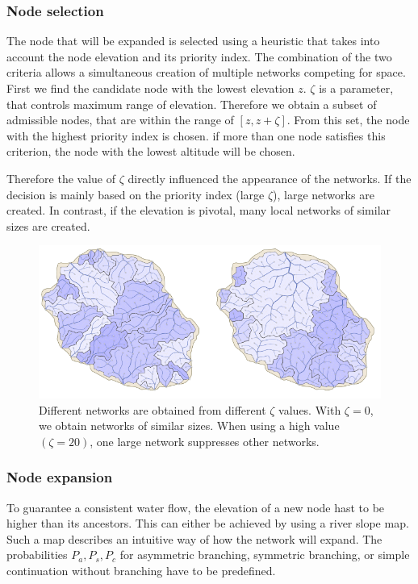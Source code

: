\subsubsection{Node selection}
The node that will be expanded is selected using a heuristic that takes into account the node elevation and its priority index. The combination of the two criteria allows a simultaneous creation of multiple networks competing for space. 
First we find the candidate node with the lowest elevation $z$. 
$\zeta $ is a parameter, that controls maximum range of elevation. Therefore we obtain a subset of admissible nodes, that are within the range of $[z, z + \zeta]$. From this set, the node with the highest priority index is chosen. if more than one node satisfies this criterion, the node with the lowest altitude will be chosen. 

Therefore the value of $\zeta$ directly influenced the appearance of the networks. If the decision is mainly based on the priority index (large $\zeta$), large networks are created. In contrast, if the elevation is pivotal, many local networks of similar sizes are created.

\begin{figure}[htb]
	\centering
	\includegraphics[width=\linewidth]{GGG13/drainage_system}
	\caption{Different networks are obtained from different $\zeta$ values. With $\zeta = 0$, we obtain networks of similar sizes. When using a high value $(\zeta = 20)$, one large network suppresses other networks. }
	\label{fig:river_network_sketch}
\end{figure}

\subsubsection{Node expansion}
To guarantee a consistent water flow, the elevation of a new node hast to be higher than its ancestors. This can either be achieved by using a river slope map. Such a map describes an intuitive way of how the network will expand. The probabilities $P_a, P_s, P_c$ for asymmetric branching, symmetric branching, or simple continuation without branching have to be predefined. 

